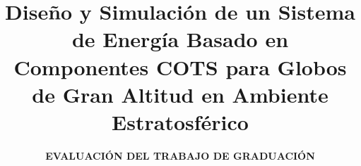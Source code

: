 \title{Diseño y Simulación de un Sistema de Energía Basado en Componentes COTS para Globos de Gran Altitud en Ambiente Estratosférico }

\mensaje{}
\author{\textbf{EVALUACIÓN DEL TRABAJO DE GRADUACIÓN}}

\address{San Salvador, El Salvador}                     %
\maketitle[logo]
